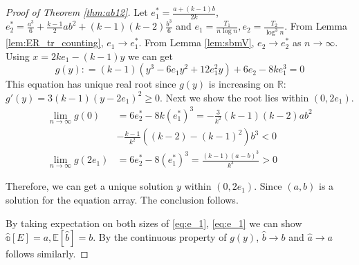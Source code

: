 \documentclass[journal]{IEEEtran}
\newcommand{\1}{\mathbbm{1}}
\begin{document}
\begin{proof}[Proof of Theorem \ref{thm:ab12}]
	Let $e^*_1 = \frac{a+(k-1)b}{2k}$, $e^*_2 = \frac{a^3}{6} + \frac{k-1}{2}ab^2 + (k-1)(k-2)\frac{b^3}{6}$
	and $e_1 = \frac{T_1}{n\log n}, e_2 = \frac{T_2}{\log^3 n}$.
	From Lemma \ref{lem:ER_tr_counting}, $e_1 \to e^*_1$.
	From Lemma \ref{lem:sbmV}, $e_2 \to e^*_2$ as $n\to \infty$.
	Using $x=2ke_1 - (k-1)y$ we can get
\begin{equation}
g(y): = (k-1)(y^3 - 6 e_1 y^2 + 12 e_1^2 y) + 6 e_2 - 8 k e_1^3 = 0
\end{equation}
This equation has unique real root since $g(y)$ is increasing on $\mathbb{R}$:  $g'(y) = 3(k-1)(y-2e_1)^2 \geq 0 $.
Next we show the root lies within $(0, 2e_1)$.
\begin{align*}
\lim_{n\to \infty}g(0) &=  6e^*_2 - 8k(e^*_1)^3 =-\frac{3}{k^2}(k-1)(k-2)ab^2 \\
 &- \frac{k-1}{k^2} ((k-2)-(k-1)^2)b^3 < 0 \\
\lim_{n\to \infty}g(2e_1) &= 6e^*_2 - 8(e^*_1)^3 = \frac{(k-1)(a-b)^3}{k^3} > 0
\end{align*}

Therefore, we can get a unique solution $y$ within $(0, 2e_1)$. Since $(a,b)$ is a solution for the equation array. The conclusion follows.

By taking expectation on both sizes of \eqref{eq:e_1}, \eqref{eq:e_1} we can show $\mathbb{\hat{a}}[E] = a,
\mathbb{E}[\hat{b}] = b$. By the continuous property of $g(y)$, $\hat{b} \to b$ and $\hat{a} \to a$ follows similarly.
\end{proof}
\end{document}
